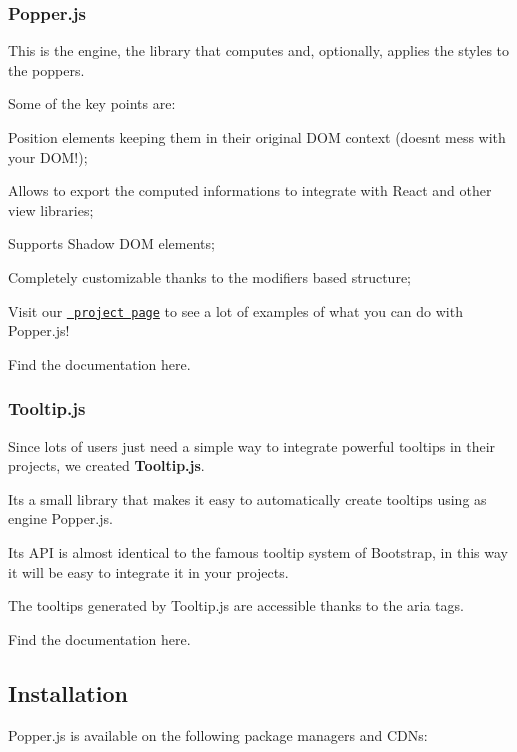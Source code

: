 \subsubsection*{Popper.\+js}

This is the engine, the library that computes and, optionally, applies the styles to the poppers.

Some of the key points are\+:


\begin{DoxyItemize}
\item Position elements keeping them in their original D\+OM context (doesn\textquotesingle{}t mess with your D\+O\+M!);
\item Allows to export the computed informations to integrate with React and other view libraries;
\item Supports Shadow D\+OM elements;
\item Completely customizable thanks to the modifiers based structure;
\end{DoxyItemize}

Visit our \href{https://fezvrasta.github.io/popper.js}{\texttt{ project page}} to see a lot of examples of what you can do with Popper.\+js!

Find the documentation here.

\subsubsection*{Tooltip.\+js}

Since lots of users just need a simple way to integrate powerful tooltips in their projects, we created {\bfseries{Tooltip.\+js}}.

It\textquotesingle{}s a small library that makes it easy to automatically create tooltips using as engine Popper.\+js.

Its A\+PI is almost identical to the famous tooltip system of Bootstrap, in this way it will be easy to integrate it in your projects.

The tooltips generated by Tooltip.\+js are accessible thanks to the {\ttfamily aria} tags.

Find the documentation here.

\subsection*{Installation}

Popper.\+js is available on the following package managers and C\+D\+Ns\+:

